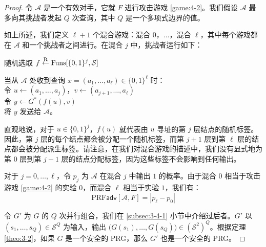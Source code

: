 \begin{proof}
令 $\mathcal{A}$ 是一个有效对手，它就 $F$ 进行攻击游戏 \ref{game:4-2}。我们假设 $\mathcal{A}$ 最多向其挑战者发起 $Q$ 次查询，其中 $Q$ 是一个多项式边界的值。

如上所述，我们定义 $\ell+1$ 个混合游戏：混合 $0$，$\dots$，混合 $\ell$，其中每个游戏都在 $\mathcal{A}$ 和一个挑战者之间进行。在混合 $j$ 中，挑战者运行如下：

\vspace{10pt}

\hspace*{5pt} 随机选取 $f\overset{\rm R}\leftarrow{\rm Funs}[\{0,1\}^j,\mathcal{S}]$

\vspace{5pt}

\hspace*{5pt} 当从 $\mathcal{A}$ 处收到查询 $x=(a_1,\dots,a_\ell)\in\{0,1\}^\ell$ 时：\\
\hspace*{50pt} 令 $u\leftarrow(a_1,\dots,a_j)$，$v\leftarrow(a_{j+1},\dots,a_\ell)$\\
\hspace*{50pt} 令 $y\leftarrow G^*(f(u),v)$\\
\hspace*{50pt} 将 $y$ 发送给 $\mathcal{A}$。

\vspace{10pt}

\noindent
直观地说，对于 $u\in\{0,1\}^j$，$f(u)$ 就代表由 $u$ 寻址的第 $j$ 层结点的随机标签。因此，第 $j$ 层的每个结点都会被分配一个随机标签，而第 $j+1$ 层到第 $\ell$ 层的结点都会被分配派生标签。请注意，在我们对混合游戏的描述中，我们没有显式地为第 $0$ 层到第 $j-1$ 层的结点分配标签，因为这些标签不会影响到任何输出。

对于 $j=0,\dots,\ell$，令 $p_j$ 为 $\mathcal{A}$ 在混合 $j$ 中输出 $1$ 的概率。由于混合 $0$ 相当于攻击游戏 \ref{game:4-2} 的实验 $0$，而混合 $\ell$ 相当于实验 $1$，我们有：
\begin{equation}\label{eq:4-30}
\mathrm{PRF}\mathsf{adv}[\mathcal{A},F]
=
|p_\ell-p_0|
\end{equation}

令 $G'$ 为 $G$ 的 $Q$ 次并行组合，我们在 \ref{subsec:3-4-1} 小节中介绍过后者。$G'$ 以 $(s_1,\dots,s_Q)\in\mathcal{S}^Q$ 为输入，输出 $\big(G(s_1),\dots,G(s_Q)\big)\in(\mathcal{S}^2)^Q$。根据定理 \ref{theo:3-2}，如果 $G$ 是一个安全的 PRG，那么 $G'$ 也是一个安全的 PRG。


\end{proof}
